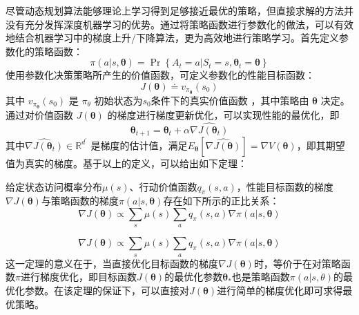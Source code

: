 尽管动态规划算法能够理论上学习得到足够接近最优的策略，但直接求解的方法并没有充分发挥深度机器学习的优势。通过将策略函数进行参数化的做法，可以有效地结合机器学习中的梯度上升/下降算法，更为高效地进行策略学习\cite{sutton1999policy,grondman2012survey}。首先定义参数化的策略函数：
\begin{equation}
\pi ( a | s , \boldsymbol { \theta } ) = \operatorname { Pr } \left\{ A _ { t } = a | S _ { t } = s , \boldsymbol { \theta } _ { t } = \boldsymbol { \theta } \right\}
\end{equation}
使用参数化决策策略所产生的价值函数，可定义参数化的性能目标函数：
\begin{equation}
    J(\boldsymbol{\theta}) \doteq v_{\pi_{\boldsymbol{\theta}}}\left(s_{0}\right)
\end{equation}
其中 $v_{\pi_{\boldsymbol{\theta}}}\left(s_{0}\right)$ 是 $\pi_\theta$ 初始状态为$s_0$条件下的真实价值函数 ，其中策略由 $\boldsymbol{\theta}$ 决定。通过对价值函数 $J ( \boldsymbol { \theta } )$ 的梯度进行梯度更新优化，可以实现性能的最优化，即
\begin{equation}
\boldsymbol { \theta } _ { t + 1 } = \boldsymbol { \theta } _ { t } + \alpha \widehat { \nabla J \left( \boldsymbol { \theta } _ { t } \right) }
\end{equation}
其中$\widehat { \nabla J \left( \boldsymbol { \theta } _ { t } \right) } \in \mathbb { R } ^ { d ^ { \prime } }$ 是梯度的估计值，满足$E_\boldsymbol{\theta}\left[\widehat { \nabla J \left( \boldsymbol { \theta } \right) }\right]=\nabla V(\boldsymbol{\theta})$，即其期望值为真实的梯度。基于以上的定义，可以给出如下定理：
\begin{theorem}
给定状态访问概率分布$\mu(s)$、行动价值函数$q_\pi(s,a)$，性能目标函数的梯度$\nabla J(\boldsymbol{\theta})$与策略函数的梯度$\pi(a | s, \boldsymbol{\theta})$存在如下所示的正比关系：
\begin{equation}
    \nabla J(\boldsymbol{\theta}) \propto \sum_{s} \mu(s) \sum_{a} q_{\pi}(s, a) \nabla \pi(a | s, \boldsymbol{\theta})
\end{equation}
\end{theorem}
\begin{equation}
    \nabla J(\boldsymbol{\theta}) \propto \sum_{s} \mu(s) \sum_{a} q_{\pi}(s, a) \nabla \pi(a | s, \boldsymbol{\theta})
\end{equation}
这一定理的意义在于，当直接优化目标函数的梯度$\nabla J(\boldsymbol{\theta})$时，等价于在对策略函数$\pi$进行梯度优化，即目标函数$J(\boldsymbol{\theta})$的最优化参数$\boldsymbol{\theta_*}$也是策略函数$\pi(a|s,\theta)$的最优化参数。在该定理的保证下，可以直接对$J(\boldsymbol{\theta})$进行简单的梯度优化即可求得最优策略。

